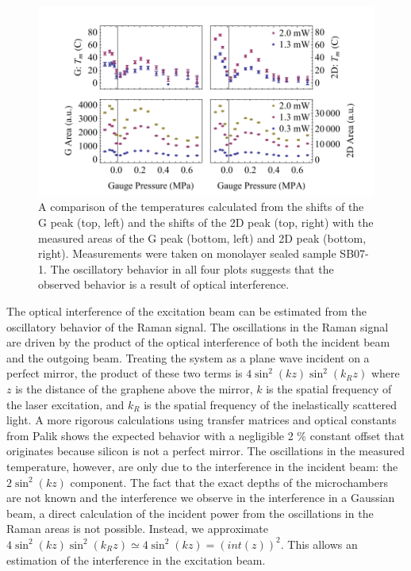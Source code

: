 \begin{figure}
	\begin{center}
	\includegraphics{Figs_Thermal/inter.pdf}
	\end{center}
	\caption[Issues with optical interference in thermal conductivity measurements]{\label{fig:therm:Inter}
		A comparison of the temperatures calculated from the shifts of the G peak (top, left) and the shifts of the 2D peak (top, right) with the measured areas of the G peak (bottom, left) and 2D peak (bottom, right).
		Measurements were taken on monolayer sealed sample SB07-1.
		The oscillatory behavior in all four plots suggests that the observed behavior is a result of optical interference.
	}
\end{figure}

The optical interference of the excitation beam can be estimated from the oscillatory behavior of the Raman signal.
The oscillations in the Raman signal are driven by the product of the optical interference of both the incident beam and the outgoing beam.
Treating the system as a plane wave incident on a perfect mirror, the product of these two terms is $4 \sin^2(k z) \sin^2(k_R z)$ where $z$ is the distance of the graphene above the mirror, $k$ is the spatial frequency of the laser excitation, and $k_R$ is the spatial frequency of the inelastically scattered light.
A more rigorous calculations using transfer matrices and optical constants from Palik \cite{Palik1991} shows the expected behavior with a negligible 2 \% constant offset that originates because silicon is not a perfect mirror.
The oscillations in the measured temperature, however, are only due to the interference in the incident beam: the $2 \sin^2(k z)$ component.
The fact that the exact depths of the microchambers are not known and the interference we observe in the interference in a Gaussian beam, a direct calculation of the incident power from the oscillations in the Raman areas is not possible.
Instead, we approximate $4 \sin^2(k z) \sin^2(k_R z) \simeq 4 \sin^2(k z) = (int(z))^2$.
This allows an estimation of the interference in the excitation beam.

